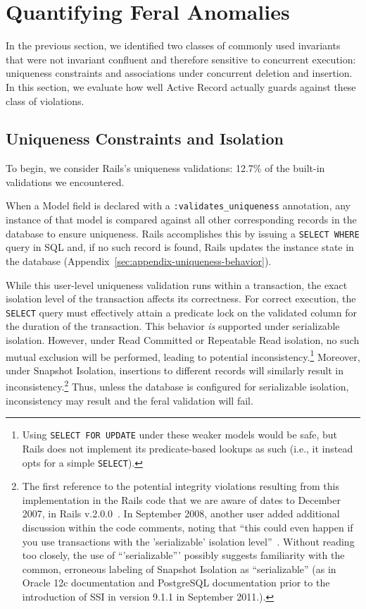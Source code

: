 
\section{Quantifying Feral Anomalies}
\label{sec:evaluation}

In the previous section, we identified two classes of commonly used
invariants that were not invariant confluent and therefore sensitive
to concurrent execution: uniqueness constraints and associations under
concurrent deletion and insertion. In this section, we evaluate
how well Active Record actually guards against these class of
violations. 

\subsection{Uniqueness Constraints and Isolation}

To begin, we consider Rails's uniqueness validations: 12.7\% of the
built-in validations we encountered.

When a Model field is declared with a \texttt{:validates\_uniqueness}
annotation, any instance of that model is compared against all other
corresponding records in the database to ensure uniqueness. Rails
accomplishes this by issuing a \texttt{SELECT WHERE} query in SQL and,
if no such record is found, Rails updates the instance state in the
database (Appendix~\ref{sec:appendix-uniqueness-behavior}).

While this user-level uniqueness validation runs within a transaction,
the exact isolation level of the transaction affects its
correctness. For correct execution, the \texttt{SELECT} query must
effectively attain a predicate lock on the validated column for the
duration of the transaction. This behavior \textit{is} supported under
serializable isolation. However, under Read Committed or Repeatable
Read isolation, no such mutual exclusion will be performed, leading to
potential inconsistency.\footnote{Using \texttt{SELECT FOR UPDATE}
  under these weaker models would be safe, but Rails does not
  implement its predicate-based lookups as such (i.e., it instead opts
  for a simple \texttt{SELECT}).}  Moreover, under Snapshot Isolation,
insertions to different records will similarly result in
inconsistency.\footnote{The first reference to the potential integrity
  violations resulting from this implementation in the Rails code that
  we are aware of dates to December 2007, in Rails
  v.2.0.0~\cite{code-unique-race-one}.  In September 2008, another
  user added additional discussion within the code comments, noting
  that ``this could even happen if you use transactions with the
  'serializable' isolation
  level''~\cite{code-unique-race-two}. Without reading too closely,
  the use of ``'serializable''' possibly suggests familiarity with the
  common, erroneous labeling of Snapshot Isolation as ``serializable''
  (as in Oracle 12c documentation and PostgreSQL documentation prior
  to the introduction of SSI in version 9.1.1 in September
  2011.)\label{fn:si-rails}. } Thus, unless the database is configured
for serializable isolation, inconsistency may result and the feral
validation will fail.

